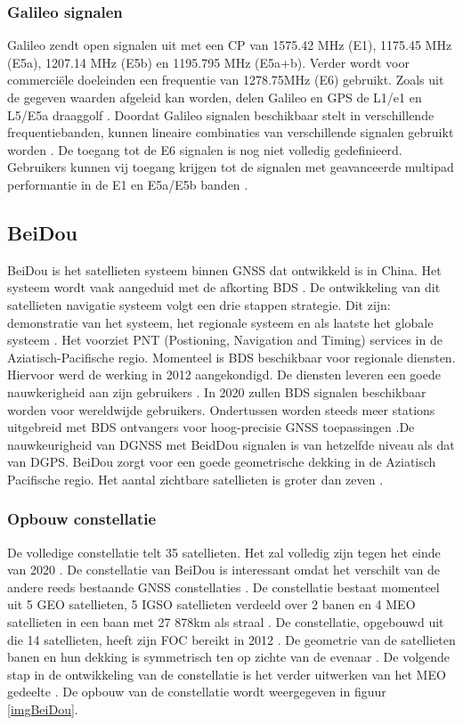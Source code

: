 \subsubsection{Galileo signalen}
Galileo zendt open signalen uit met een CP van 1575.42 MHz (E1), 1175.45 MHz (E5a), 1207.14 MHz (E5b) en 1195.795 MHz (E5a+b). Verder wordt voor commerci\"ele doeleinden een frequentie van 1278.75MHz (E6) gebruikt. Zoals uit de gegeven waarden afgeleid kan worden, delen Galileo en GPS de  L1/e1 en L5/E5a draaggolf \cite{LBibPPP2}. Doordat Galileo signalen beschikbaar stelt in verschillende frequentiebanden, kunnen lineaire combinaties van verschillende signalen gebruikt worden \cite{LBibGalileo3}. De toegang tot de E6 signalen is nog niet volledig gedefinieerd. Gebruikers kunnen vij toegang krijgen tot de signalen met geavanceerde multipad performantie in de E1 en E5a/E5b banden \cite{LBibGNSS9}. 

\subsection{BeiDou}
\label{LBeD}
BeiDou is het satellieten systeem binnen GNSS dat ontwikkeld is in China. Het systeem wordt vaak  aangeduid met de afkorting BDS \cite{LBibBeiDou}. De ontwikkeling van dit satellieten navigatie systeem volgt een drie stappen strategie. Dit zijn: demonstratie van het systeem, het regionale systeem en als laatste het globale systeem \cite{LBibBeiDou4}. Het voorziet PNT (Postioning, Navigation and Timing) services in de Aziatisch-Pacifische regio. Momenteel is BDS  beschikbaar voor regionale diensten. Hiervoor werd de werking in 2012 aangekondigd. De diensten leveren een goede nauwkerigheid aan zijn gebruikers \cite{LBibBeiDou, LBibGNSS9}. In 2020 zullen BDS signalen beschikbaar worden voor wereldwijde gebruikers. Ondertussen worden steeds meer stations uitgebreid met BDS ontvangers voor hoog-precisie GNSS toepassingen \cite{LBibBeiDou}.De nauwkeurigheid van DGNSS met BeidDou signalen is van hetzelfde niveau als dat van DGPS. BeiDou zorgt voor een goede geometrische dekking in de Aziatisch Pacifische regio. Het aantal zichtbare satellieten is groter dan zeven \cite{LBibBeiDou4}. 

\subsubsection{Opbouw constellatie}
De volledige constellatie telt 35 satellieten. Het zal volledig zijn tegen het einde van 2020 \cite{LBibGNSS4}. De constellatie van BeiDou is interessant omdat het verschilt van de andere reeds bestaande GNSS constellaties \cite{LBibBeiDou3}.  De constellatie bestaat momenteel uit 5 GEO satellieten, 5 IGSO satellieten verdeeld over 2 banen en 4 MEO satellieten in een baan met 27 878km als straal \cite{LBibBeiDou2}. De constellatie, opgebouwd uit die 14 satellieten, heeft zijn FOC bereikt in 2012 \cite{LBibBeiDou4}. De geometrie van de satellieten banen en hun dekking is symmetrisch ten op zichte van de evenaar \cite{LBibBeiDou5}.  De volgende stap in de ontwikkeling van de constellatie is het verder uitwerken van het MEO gedeelte \cite{LBibPPP2}. De opbouw van de constellatie wordt weergegeven in figuur \ref{imgBeiDou}.

